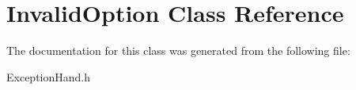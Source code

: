 \hypertarget{class_invalid_option}{}\section{Invalid\+Option Class Reference}
\label{class_invalid_option}


The documentation for this class was generated from the following file\+:\begin{DoxyCompactItemize}
\item 
Exception\+Hand.\+h\end{DoxyCompactItemize}
